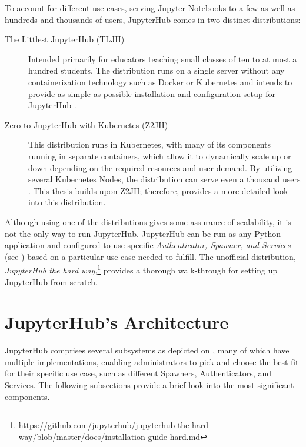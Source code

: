 \documentclass[
  digital,     %
  oneside,     %
  nosansbold,  %
  nocolorbold, %
  lof,         %
  nolot,         %
]{fithesis4}
\begin{document}
To account for different use cases, serving Jupyter Notebooks to a few as well as hundreds and thousands of users, JupyterHub comes in two distinct distributions:
\begin{description}

    \item[The Littlest JupyterHub (TLJH)]
    Intended primarily for educators teaching small classes of ten to at most a hundred students. The distribution runs on a single server without any containerization technology such as Docker or Kubernetes and intends to provide as simple as possible installation and configuration setup for JupyterHub \cite{littlest_jupyterhub}.

    \item[Zero to JupyterHub with Kubernetes (Z2JH)]
    This distribution runs in Kubernetes, with many of its components running in separate containers, which allow it to dynamically scale up or down depending on the required resources and user demand. By utilizing several Kubernetes Nodes, the distribution can serve even a thousand users \cite{jupyterhub}. This thesis builds upon Z2JH; therefore,  provides a more detailed look into this distribution.
    
\end{description}

Although using one of the distributions gives some assurance of scalability, it is not the only way to run JupyterHub. JupyterHub can be run as any Python application and configured to use specific \emph{Authenticator, Spawner, and Services} (see ) based on a particular use-case needed to fulfill. The unofficial distribution, \emph{JupyterHub the hard way},\footnote{\url{https://github.com/jupyterhub/jupyterhub-the-hard-way/blob/master/docs/installation-guide-hard.md}} provides a thorough walk-through for setting up JupyterHub from scratch.


\section{JupyterHub's Architecture}
\label{subsec:jupyterhub:architecture}
JupyterHub comprises several subsystems as depicted on , many of which have multiple implementations, enabling administrators to pick and choose the best fit for their specific use case, such as different Spawners, Authenticators, and Services. The following subsections provide a brief look into the most significant components.
\end{document}
